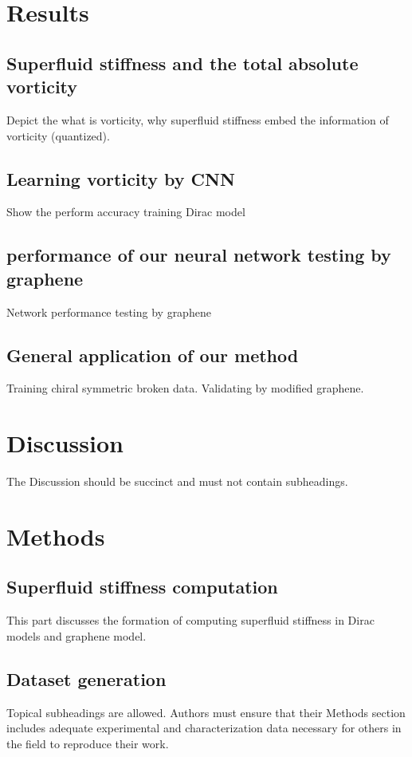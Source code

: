 \documentclass[fleqn,10pt,twocolumn]{wlscirep}
\begin{document}
\section*{Results}


\subsection*{Superfluid stiffness and the total absolute vorticity}

Depict the what is vorticity, why superfluid stiffness embed the information of vorticity (quantized).

\subsection*{Learning vorticity by CNN}

Show the perform accuracy training Dirac model

\subsection*{performance of our neural network testing by graphene}

Network performance testing by graphene

\subsection*{General application of our method}

Training chiral symmetric broken data. Validating by modified graphene.

\section*{Discussion}

The Discussion should be succinct and must not contain subheadings.

\section*{Methods}
\subsection*{Superfluid stiffness computation}
This part discusses the formation of computing superfluid stiffness in Dirac models and graphene model. 


\subsection*{Dataset generation}
Topical subheadings are allowed. Authors must ensure that their Methods section includes adequate experimental and characterization data necessary for others in the field to reproduce their work.
\end{document}
